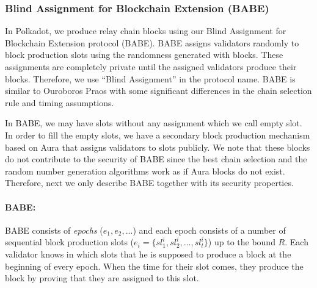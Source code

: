\subsubsection{Blind Assignment for Blockchain Extension (BABE)}
\label{sec:babe}

In Polkadot, we produce relay chain blocks using our Blind Assignment for Blockchain Extension protocol (BABE).
BABE assigns validators randomly to block production slots using  the randomness generated with blocks. These assignments are completely private until the assigned validators produce their blocks. Therefore, we use ``Blind Assignment'' in the protocol name. BABE is similar to Ouroboros Praos \cite{Praos} with some significant differences in the chain selection rule and timing assumptions.

In BABE, we may have slots without any assignment
 which we call empty slot. 
In order to fill the empty slots, we have a
secondary block production mechanism based on Aura \cite{aura} that assigns validators to slots publicly. We note that these blocks do not contribute to
the security of BABE since the best chain selection and the random number generation algorithms work as if Aura blocks do not exist.
Therefore, next we only describe BABE together with its security properties.

\paragraph{BABE:}

BABE \cite{babe} consists of \emph{epochs} ($e_1,e_2,...$) and each epoch consists of a number of sequential block production slots (\(e_i = \{sl^i_{1}, sl^i_{2},\ldots,sl^i_{t}\}\)) up to the bound  $R$.
Each validator knows in which slots that he is supposed to produce a block at the beginning of every epoch. When the time for their slot comes, they produce the block by proving that they are assigned to
this slot.

